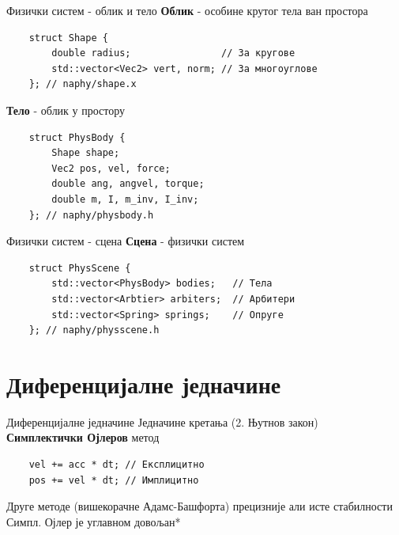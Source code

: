 \documentclass[]{beamer}
\begin{document}
\begin{frame}[fragile]{Физички систем - облик и тело}
    \textbf{Облик} - особине крутог тела ван простора
    
    \begin{verbatim}
    struct Shape {
        double radius;                // За кругове
        std::vector<Vec2> vert, norm; // За многоуглове
    }; // naphy/shape.х
    \end{verbatim}
    
    \textbf{Тело} - облик у простору
    
    \begin{verbatim}
    struct PhysBody {
        Shape shape;
        Vec2 pos, vel, force;
        double ang, angvel, torque;
        double m, I, m_inv, I_inv;
    }; // naphy/physbody.h
    \end{verbatim}
    
\end{frame}

\begin{frame}[fragile]{Физички систем - сцена}
    \textbf{Сцена} - физички систем
    
    \begin{verbatim}
    struct PhysScene {
        std::vector<PhysBody> bodies;   // Тела
        std::vector<Arbtier> arbiters;  // Арбитери
        std::vector<Spring> springs;    // Опруге
    }; // naphy/physscene.h
    \end{verbatim}
    
\end{frame}


\section{Диференцијалне једначине}
\begin{frame}[fragile]{Диференцијалне једначине}
    Једначине кретања (2. Њутнов закон) \\
    \textbf{Симплектички Ојлеров} метод

    \begin{verbatim}
    vel += acc * dt; // Експлицитно
    pos += vel * dt; // Имплицитно
    \end{verbatim}
    
    Друге методе (вишекорачне Адамс-Башфорта) прецизније али исте стабилности \\
    Симпл. Ојлер је углавном довољан*
\end{frame}
\end{document}
